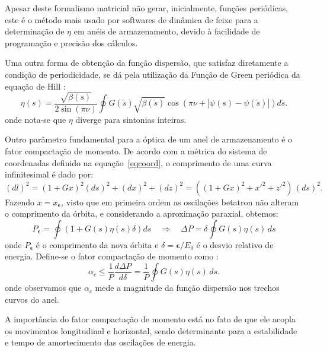 Apesar deste formalismo matricial não gerar, inicialmente, funções periódicas, este é o método mais usado por softwares de dinâmica de feixe para a determinação de $\eta$ em anéis de armazenamento, devido à facilidade de programação e precisão dos cálculos.

Uma outra forma de obtenção da função dispersão, que satisfaz diretamente a condição de periodicidade, se dá pela utilização da Função de Green periódica da equação de Hill \cite{Lee}: 
\begin{equation}
 \eta(s) =  \frac{\sqrt{\beta(s)}}{2\sin(\pi \nu)}\oint G(\tilde{s})
\sqrt{\beta(\tilde{s})} \cos \left(\pi \nu +|\psi(s) - \psi(\tilde{s})|\right)d
\tilde{s}.
\end{equation}
onde nota-se que $\eta$ diverge para sintonias inteiras.

Outro parâmetro fundamental para a óptica de um anel de armazenamento é o fator compactação de momento. De acordo com a métrica do sistema de coordenadas definido na \mbox{equação \ref{eqcoord}}, o comprimento de uma curva infinitesimal é dado por:
\begin{equation}
 (d l)^2 = (1+G x)^2(d s)^2+(d x)^2+(d z)^2 = \left((1+G x)^2+x'^2+ 
z'^2\right)\,(ds)^2.
\end{equation}
Fazendo $x=x_{\boldsymbol{\epsilon}}$, visto que em primeira ordem as oscilações betatron não alteram o comprimento da órbita, e considerando a aproximação paraxial, obtemos:
\begin{equation}
 P_{\boldsymbol{\epsilon}} = \oint (1+G(s) \eta(s) \delta)ds \quad \Rightarrow
\quad
\Delta P = \delta \oint G(s) \eta(s)\, d s
\end{equation}
onde $P_{\boldsymbol{\epsilon}}$ é o comprimento da nova órbita e $\delta = \boldsymbol{\epsilon} / E_0$ é o desvio relativo de energia. Define-se o fator compactação de momento como \cite{Lee}:
\begin{equation}
 \alpha_c \leq \frac{1}{P} \frac{d \Delta P}{d \delta} = \frac{1}{P}
\oint G(s) \eta(s) \, d s.
\end{equation}
onde observamos que $\alpha_c$ mede a magnitude da função dispersão nos trechos curvos do anel.

A importância do fator compactação de momento está no fato de que ele acopla os movimentos longitudinal e horizontal, sendo determinante para a estabilidade e tempo de amortecimento das oscilações de energia.

